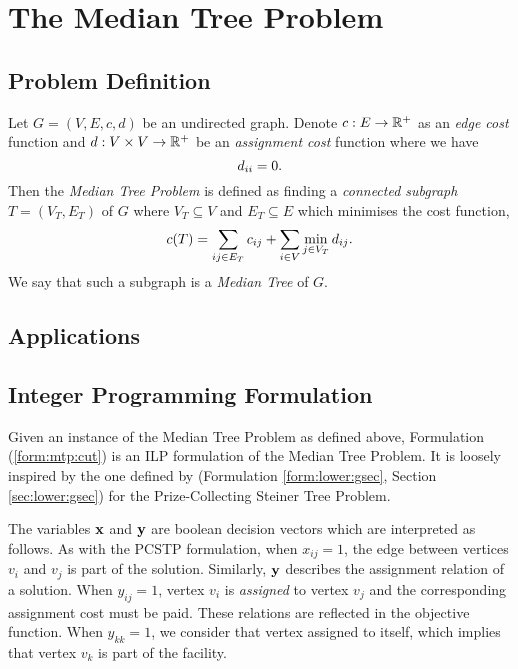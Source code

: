 
\chapter{The Median Tree Problem}
\label{chap:mediantree}


\section{Problem Definition}

Let $G = (V, E, c, d)$ be an undirected graph. Denote $c : E \to \mathbb{R}^+$ as an \textit{edge cost} function
and $d : V \times V  \to \mathbb{R}^+$ be an \textit{assignment cost} function where we have
$$d_{ii} = 0 \mathnormal{.}$$
Then the \textit{Median Tree Problem}
is defined as finding a \textit{connected subgraph} $T = (V_T, E_T)$ of $G$
where $V_T \subseteq V$ and
$E_T \subseteq E$ which minimises the cost function,
$$c(T) = \sum_{ij \in E_T} c_{ij} + \sum_{i \in V} \min_{j \in V_T} d_{ij}\mathnormal{.}$$
We say that such a subgraph is a \textit{Median Tree} of $G$.


\section{Applications}

\section{Integer Programming Formulation}

Given an instance of the Median Tree Problem as defined above,
Formulation (\ref{form:mtp:cut}) is an ILP formulation of the Median Tree Problem.
It is loosely inspired by the one defined by \citet{lucena2004strong}
(Formulation \ref{form:lower:gsec}, Section \ref{sec:lower:gsec}) for the Prize-Collecting
Steiner Tree Problem.

The variables $\mathbf{x}$ and $\mathbf{y}$ are boolean
decision vectors which are interpreted as follows.
As with the PCSTP formulation, when $x_{ij} = 1$,
the edge between vertices $v_i$ and $v_j$ is part of the solution.
Similarly, $\mathbf{y}$ describes the assignment relation of a solution. When
$y_{ij} = 1$, vertex $v_i$ is \textit{assigned} to vertex $v_j$ and the corresponding
assignment cost must be paid. 
These relations are reflected in the objective function.
When $y_{kk} = 1$, we consider that vertex assigned to
itself, which implies that vertex $v_k$ is part of the facility.

